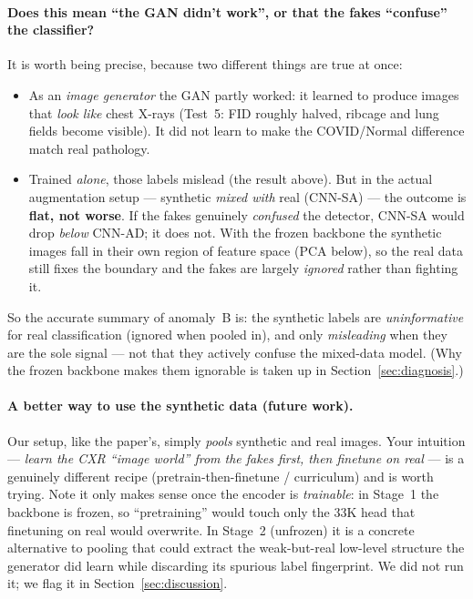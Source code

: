 \documentclass[11pt]{article}
\begin{document}
\paragraph{Does this mean ``the GAN didn't work'', or that the fakes ``confuse''
the classifier?} It is worth being precise, because two different things are true
at once:
\begin{itemize}[nosep,leftmargin=1.4em]
  \item As an \emph{image generator} the GAN partly worked: it learned to produce
        images that \emph{look like} chest X-rays (Test~5: FID roughly halved,
        ribcage and lung fields become visible). It did not learn to make the
        COVID/Normal difference match real pathology.
  \item Trained \emph{alone}, those labels mislead (the result above). But in the
        actual augmentation setup --- synthetic \emph{mixed with} real (CNN-SA) ---
        the outcome is \textbf{flat, not worse}. If the fakes genuinely
        \emph{confused} the detector, CNN-SA would drop \emph{below} CNN-AD; it does
        not. With the frozen backbone the synthetic images fall in their own region
        of feature space (PCA below), so the real data still fixes the boundary and
        the fakes are largely \emph{ignored} rather than fighting it.
\end{itemize}
So the accurate summary of anomaly~B is: the synthetic labels are
\emph{uninformative} for real classification (ignored when pooled in), and only
\emph{misleading} when they are the sole signal --- not that they actively confuse
the mixed-data model. (Why the frozen backbone makes them ignorable is taken up in
Section~\ref{sec:diagnosis}.)

\paragraph{A better way to use the synthetic data (future work).} Our setup, like
the paper's, simply \emph{pools} synthetic and real images. Your intuition ---
\emph{learn the CXR ``image world'' from the fakes first, then finetune on real}
--- is a genuinely different recipe (pretrain-then-finetune / curriculum) and is
worth trying. Note it only makes sense once the encoder is \emph{trainable}: in
Stage~1 the backbone is frozen, so ``pretraining'' would touch only the 33K head
that finetuning on real would overwrite. In Stage~2 (unfrozen) it is a concrete
alternative to pooling that could extract the weak-but-real low-level structure the
generator did learn while discarding its spurious label fingerprint. We did not run
it; we flag it in Section~\ref{sec:discussion}.
\end{document}
